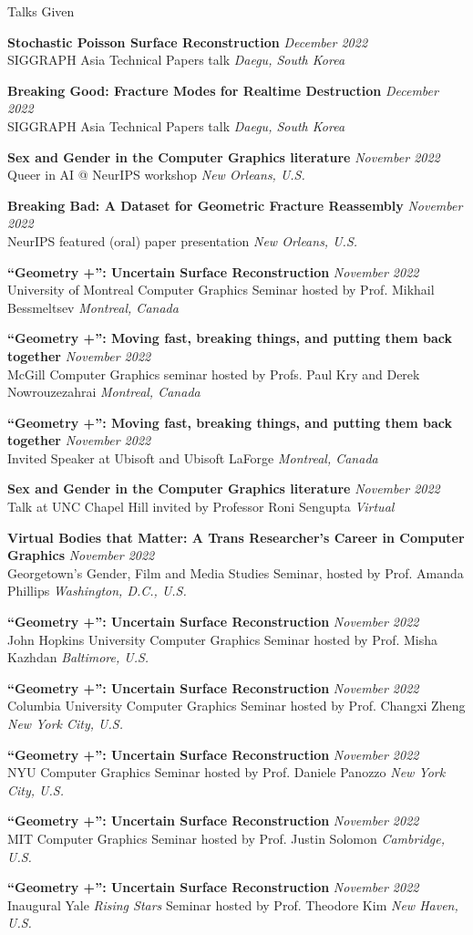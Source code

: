 \documentclass{resume}
\newcommand{\talk}[4]{
    {\bf #1} \hfill {\em \small #2} \\ %
    {\small #3} \hfill {\em \small #4}
}
\begin{document}
\begin{rSection}{Talks Given}
\talk{Stochastic Poisson Surface Reconstruction}{December 2022}{SIGGRAPH Asia Technical Papers talk}{Daegu, South Korea}

\talk{Breaking Good: Fracture Modes for Realtime Destruction}{December 2022}{SIGGRAPH Asia Technical Papers talk}{Daegu, South Korea}

\talk{Sex and Gender in the Computer Graphics literature}{November 2022}{Queer in AI @ NeurIPS workshop}{New Orleans, U.S.}

\talk{Breaking Bad: A Dataset for Geometric Fracture Reassembly}{November 2022}{NeurIPS featured (oral) paper presentation}{New Orleans, U.S.}

\talk{``Geometry +'': Uncertain Surface Reconstruction}{November 2022}{University of Montreal Computer Graphics Seminar hosted by Prof. Mikhail Bessmeltsev}{Montreal, Canada}

\talk{``Geometry +'': Moving fast, breaking things, and putting them back together}{November 2022}{McGill Computer Graphics seminar hosted by Profs. Paul Kry and Derek Nowrouzezahrai}{Montreal, Canada}

\talk{``Geometry +'': Moving fast, breaking things, and putting them back together}{November 2022}{Invited Speaker at Ubisoft and Ubisoft LaForge}{Montreal, Canada}

\talk{Sex and Gender in the Computer Graphics literature}{November 2022}{Talk at UNC Chapel Hill invited by Professor Roni Sengupta}{Virtual}

\talk{Virtual Bodies that Matter: A Trans Researcher’s Career in Computer Graphics}{November 2022}{Georgetown's Gender, Film and Media Studies Seminar, hosted by Prof. Amanda Phillips}{Washington, D.C., U.S.}

\talk{``Geometry +'': Uncertain Surface Reconstruction}{November 2022}{John Hopkins University Computer Graphics Seminar hosted by Prof. Misha Kazhdan}{Baltimore, U.S.}

\talk{``Geometry +'': Uncertain Surface Reconstruction}{November 2022}{Columbia University Computer Graphics Seminar hosted by Prof. Changxi Zheng}{New York City, U.S.}

\talk{``Geometry +'': Uncertain Surface Reconstruction}{November 2022}{NYU Computer Graphics Seminar hosted by Prof. Daniele Panozzo}{New York City, U.S.}

\talk{``Geometry +'': Uncertain Surface Reconstruction}{November 2022}{MIT Computer Graphics Seminar hosted by Prof. Justin Solomon}{Cambridge, U.S.}

\talk{``Geometry +'': Uncertain Surface Reconstruction}{November 2022}{Inaugural Yale \textit{Rising Stars} Seminar hosted by Prof. Theodore Kim}{New Haven, U.S.}


\end{rSection}
\end{document}
